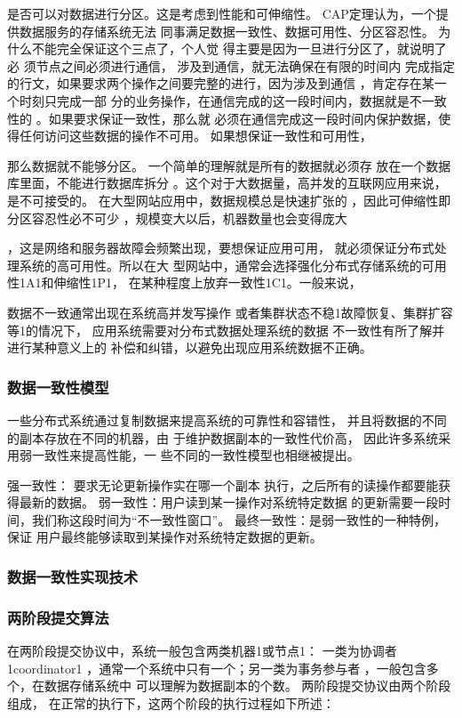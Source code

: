 是否可以对数据进行分区。这是考虑到性能和可伸缩性。
CAP定理认为，一个提供数据服务的存储系统无法
同事满足数据一致性、数据可用性、分区容忍性。
为什么不能完全保证这个三点了，个人觉
得主要是因为一旦进行分区了，就说明了必
须节点之间必须进行通信，
涉及到通信，就无法确保在有限的时间内
完成指定的行文，如果要求两个操作之间要完整的进行，因为涉及到通信
，肯定存在某一个时刻只完成一部
分的业务操作，在通信完成的这一段时间内，数据就是不一致性的
。如果要求保证一致性，那么就
必须在通信完成这一段时间内保护数据，使得任何访问这些数据的操作不可用。
如果想保证一致性和可用性，

那么数据就不能够分区。
一个简单的理解就是所有的数据就必须存
放在一个数据库里面，不能进行数据库拆分
。这个对于大数据量，高并发的互联网应用来说，是不可接受的。
在大型网站应用中，数据规模总是快速扩张的
，因此可伸缩性即分区容忍性必不可少
，规模变大以后，机器数量也会变得庞大

，这是网络和服务器故障会频繁出现，要想保证应用可用，
就必须保证分布式处理系统的高可用性。所以在大
型网站中，通常会选择强化分布式存储系统的可用性1A1和伸缩性1P1，
在某种程度上放弃一致性1C1。一般来说，

数据不一致通常出现在系统高并发写操作
或者集群状态不稳1故障恢复、集群扩容等1的情况下，
应用系统需要对分布式数据处理系统的数据
不一致性有所了解并进行某种意义上的
补偿和纠错，以避免出现应用系统数据不正确。
\subsubsection*{数据一致性模型}
一些分布式系统通过复制数据来提高系统的可靠性和容错性，
并且将数据的不同的副本存放在不同的机器，由
于维护数据副本的一致性代价高，
因此许多系统采用弱一致性来提高性能，一
些不同的一致性模型也相继被提出。

强一致性： 要求无论更新操作实在哪一个副本
执行，之后所有的读操作都要能获得最新的数据。
弱一致性：用户读到某一操作对系统特定数据
的更新需要一段时间，我们称这段时间为“不一致性窗口”。
最终一致性：是弱一致性的一种特例，保证
用户最终能够读取到某操作对系统特定数据的更新。
\subsubsection*{数据一致性实现技术}

\subsubsection*{两阶段提交算法}
在两阶段提交协议中，系统一般包含两类机器1或节点1：
一类为协调者1coordinator1
，通常一个系统中只有一个；另一类为事务参与者
，一般包含多个，在数据存储系统中
可以理解为数据副本的个数。
两阶段提交协议由两个阶段组成，
在正常的执行下，这两个阶段的执行过程如下所述：

